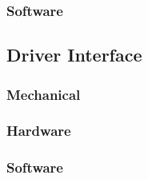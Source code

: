 \subsubsection{Software}

\subsection{Driver Interface}

\subsubsection{Mechanical}
\subsubsection{Hardware}
\subsubsection{Software}
